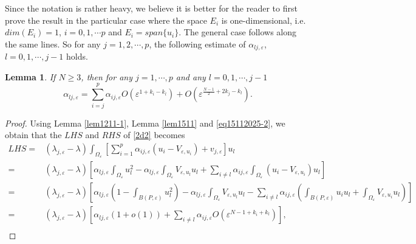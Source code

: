\documentclass[11pt,reqno]{article}
\newtheorem{lemma}[teo]{Lemma}
\numberwithin{equation}{section}
\newcommand\e\varepsilon
\renewcommand\O\Omega
\begin{document}
Since the notation is rather heavy, we believe it is better for the reader to first prove the result in the particular case where the space $E_i$ is one-dimensional, i.e. $dim(E_i)=1$, $i=0,1,\cdots p$ and $E_i=span\{u_i\}$. The general case follows along the same lines. So for any $j=1,2,\cdots,p$, the following estimate of $\alpha_{lj,\e}$, $l=0,1,\cdots,j-1$ holds.
 
\begin{lemma}\label{thsa}
If $N\ge3$, then
for any $j=1,\cdots,p$ and  any $l=0,1,\cdots,j-1$
    \begin{equation*}
    \alpha_{lj,\e}=\sum_{i=j}^{ p}\alpha_{ij,\e}O(\e^{1+{ k_i}-{ k_l}})+O(\e^{\frac{N-1}{2}+2{ k_j}-{ k_l}}).
\end{equation*}
\end{lemma}
\begin{proof}
Using  Lemma \ref{lem1211-1}, Lemma \ref{lem1511} and \eqref{eq15112025-2}, we obtain that  the $LHS$ and $RHS$ of \eqref{2d2} becomes
\begin{equation}\label{eq0612-1}
            \begin{aligned}
                LHS=&(\lambda_{j,\e}-\lambda)\int_{\O_\e}\left[ \sum_{i=1}^{p}\alpha_{ij,\e} (u_i-V_{\e,u_i})+ v_{j,\e}\right]u_l\\
                =&(\lambda_{j,\e}-\lambda)\left[\alpha_{lj,\e}\int_{\O_\e}u_l^2- \alpha_{lj,\e}\int_{\O_\e}V_{\e,u_l}u_l+\sum_{i\neq l}\alpha_{ij,\e} \int_{\O_\e}(u_i-V_{\e,u_i})u_l\right]\\
                =&(\lambda_{j,\e}-\lambda)\left[\alpha_{lj,\e}\left(1-\int_{B(P,\e)}u_l^2\right)- \alpha_{lj,\e}\int_{\O_\e}V_{\e,u_l}u_l-\sum_{i\neq l}\alpha_{ij,\e} \left(\int_{B(P,\e)}u_iu_l+\int_{\O_\e}V_{\e,u_i}u_l\right)\right]\\
                =&(\lambda_{j,\e}-\lambda)\left[\alpha_{lj,\e}\left(1+o(1)\right)+\sum_{i\neq l}\alpha_{ij,\e} O(\e^{N-1+{ k_i}+{ k_l}})\right],\\

\end{aligned}
\end{equation}
\end{proof}
\end{document}
